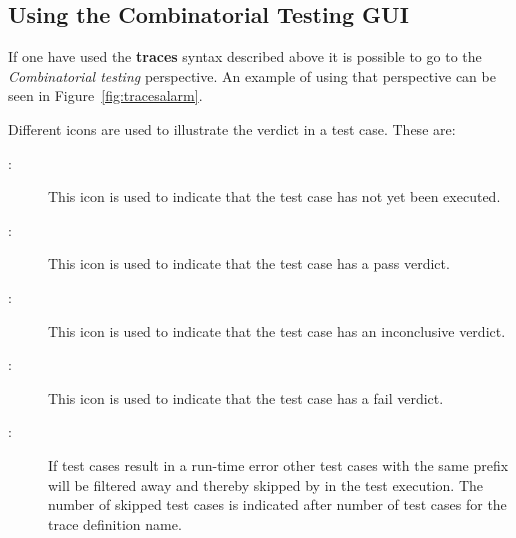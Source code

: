 \documentclass{overturerep}
\begin{document}
{\subsection{Using the Combinatorial Testing GUI}

If one have used the {\bf\ttfamily traces} syntax described above it
is possible to go to the \emph{Combinatorial testing}
perspective. An example of using that
perspective can be seen in
Figure~\ref{fig:tracesalarm}.

Different icons are used to illustrate the verdict in a test
case. These are:
\begin{description}
\item[\hspace{-1.8mm}
:]
  This icon is used to indicate that the test case has not yet been
  executed.
\item[\hspace{-1.8mm}
:] This icon is used to indicate that the test case has a pass
  verdict.
\item[\hspace{-1.8mm}
:] This icon is used to indicate that the test case has an inconclusive
  verdict.
\item[\hspace{-1.8mm}
:]
This icon is used to indicate that the test case has a fail
verdict.
\item[\hspace{-1.8mm}
:] 
If test cases result in a run-time error other test cases with the
same prefix will be filtered away and thereby skipped by in the test
execution. The number of skipped test cases is indicated after number
of test cases for the trace definition name.
\end{description}


}
\end{document}
